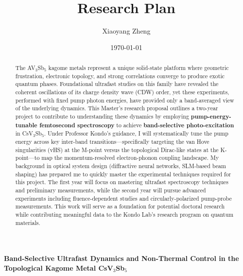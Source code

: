 \documentclass[12pt,a4paper]{article}
\title{Research Plan}
\author{Xiaoyang Zheng}
\date{\today}
\begin{document}
\begin{center}
    \large \textbf{Band-Selective Ultrafast Dynamics and Non-Thermal Control in the Topological Kagome Metal CsV$_3$Sb$_5$}
\end{center}
\sloppy

\noindent{}

\vspace{0.3cm}

\begin{abstract}
The AV$_3$Sb$_5$ kagome metals represent a unique solid-state platform where geometric frustration, electronic topology, and strong correlations converge to produce exotic quantum phases. Foundational ultrafast studies on this family have revealed the coherent oscillations of its charge density wave (CDW) order, yet these experiments, performed with fixed pump photon energies, have provided only a band-averaged view of the underlying dynamics. This Master's research proposal outlines a two-year project to contribute to understanding these dynamics by employing \textbf{pump-energy-tunable femtosecond spectroscopy} to achieve \textbf{band-selective photo-excitation} in CsV$_3$Sb$_5$. Under Professor Kondo's guidance, I will systematically tune the pump energy across key inter-band transitions—specifically targeting the van Hove singularities (vHS) at the M-point versus the topological Dirac-like states at the K-point—to map the momentum-resolved electron-phonon coupling landscape. My background in optical system design (diffractive neural networks, SLM-based beam shaping) has prepared me to quickly master the experimental techniques required for this project. The first year will focus on mastering ultrafast spectroscopy techniques and preliminary measurements, while the second year will pursue advanced experiments including fluence-dependent studies and circularly-polarized pump-probe measurements. This work will serve as a foundation for potential doctoral research while contributing meaningful data to the Kondo Lab's research program on quantum materials.
\end{abstract}
\end{document}
